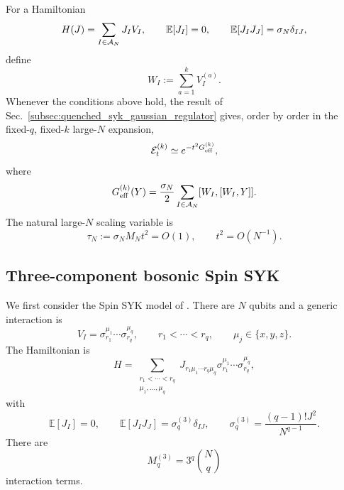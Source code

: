 \documentclass{article}
\theoremstyle{definition}
\begin{document}
For a Hamiltonian
\begin{equation}
    H(J)=\sum_{I\in{\cal A}_N}J_IV_I,
    \qquad
    \mathbb E[J_I]=0,
    \qquad
    \mathbb E[J_IJ_J]=\sigma_N\delta_{IJ},
    \label{eq:spin_syk_general_H}
\end{equation}
define
\begin{equation}
    W_I
    :=
    \sum_{a=1}^kV_I^{(a)}.
\end{equation}
Whenever the conditions above hold, the result of
Sec.~\ref{subsec:quenched_syk_gaussian_regulator} gives, order by order
in the fixed-$q$, fixed-$k$ large-$N$ expansion,
\begin{equation}
    {\cal E}_t^{(k)}
    \simeq
    e^{-t^2G_{\rm eff}^{(k)}},
    \label{eq:spin_syk_general_regulator}
\end{equation}
where
\begin{equation}
    G_{\rm eff}^{(k)}(Y)
    =
    \frac{\sigma_N}{2}
    \sum_{I\in{\cal A}_N}
    [W_I,[W_I,Y]].
    \label{eq:spin_syk_Geff_general}
\end{equation}
The natural large-$N$ scaling variable is
\begin{equation}
    \tau_N
    :=
    \sigma_NM_Nt^2
    =
    O(1),
    \qquad
    t^2=O(N^{-1}).
    \label{eq:spin_syk_diffusive_scaling}
\end{equation}


\subsection{Three-component bosonic Spin SYK}
\label{subsec:three_component_spin_syk_regulator}

We first consider the Spin SYK model of \cite{SwingleWiner}.  There are
$N$ qubits and a generic interaction is
\begin{equation}
    V_I
    =
    \sigma_{r_1}^{\mu_1}\cdots\sigma_{r_q}^{\mu_q},
    \qquad
    r_1<\cdots<r_q,
    \qquad
    \mu_j\in\{x,y,z\}.
    \label{eq:SW_VI}
\end{equation}
The Hamiltonian is
\begin{equation}
    H
    =
    \sum_{\substack{r_1<\cdots<r_q\\
                    \mu_1,\ldots,\mu_q}}
    J_{r_1\mu_1\cdots r_q\mu_q}
    \sigma_{r_1}^{\mu_1}\cdots\sigma_{r_q}^{\mu_q},
    \label{eq:SW_H}
\end{equation}
with
\begin{equation}
    \mathbb E[J_I]=0,
    \qquad
    \mathbb E[J_IJ_J]
    =
    \sigma_q^{(3)}\delta_{IJ},
    \qquad
    \sigma_q^{(3)}
    =
    \frac{(q-1)!J^2}{N^{q-1}}.
    \label{eq:SW_sigma}
\end{equation}
There are
\begin{equation}
    M_q^{(3)}
    =
    3^q\binom Nq
    \label{eq:SW_number_terms}
\end{equation}
interaction terms.
\end{document}
